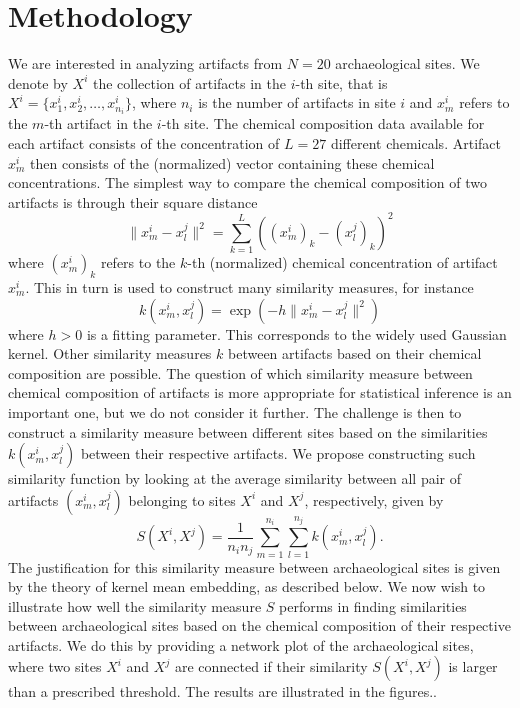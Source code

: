 \section{Methodology}
\label{sec:methodology}
We are interested in analyzing artifacts from $N=20$ archaeological sites. We denote by $X^i$ the collection of artifacts in the $i$-th site, that is $X^i=\{x^i_1,x^i_2,\dots,x^i_{n_i}\}$, where $n_i$ is the number of artifacts in site $i$ and $x^i_m$ refers to the $m$-th artifact in the $i$-th site.
The chemical composition data available for each artifact consists of the concentration of $L=27$ different chemicals. Artifact $x^i_m$ then consists of the (normalized) vector containing these chemical concentrations.
The simplest way to compare the chemical composition of two artifacts is through their square distance
$$ \| x^i_m - x^j_l \|^2 = \sum_{k=1}^L ( (x^i_m)_k - (x^j_l)_k )^2$$
where $(x^i_m)_k$ refers to the $k$-th (normalized) chemical concentration of artifact $x^i_m$.
This in turn is used to construct many similarity measures, for instance
$$ k(x^i_m,x^j_l) = \exp(-h\|x^i_m - x^j_l \|^2)$$
where $h>0$ is a fitting parameter. This corresponds to the widely used Gaussian kernel. Other similarity measures $k$ between artifacts based on their chemical composition are possible. The question of which similarity measure between chemical composition of artifacts is more appropriate for statistical inference is an important one, but we do not consider it further.
The challenge is then to construct a similarity measure between different sites based on the similarities ${k(x^i_m,x^j_l)}$ between their respective artifacts. We propose constructing such similarity function by looking at the average similarity between all pair of artifacts $(x^i_m,x^j_l)$ belonging to sites $X^i$ and $X^j$, respectively, given by
$$S(X^i,X^j) = \frac{1}{n_i n_j} \sum_{m=1}^{n_i} \sum_{l=1}^{n_j} k(x^i_m,x^j_l).$$
The justification for this similarity measure between archaeological sites is given by the theory of kernel mean embedding, as described below.
We now wish to illustrate how well the similarity measure $S$ performs in finding similarities between archaeological sites based on the chemical composition of their respective artifacts. We do this by providing a network plot of the archaeological sites, where two sites $X^i$ and $X^j$ are connected if their similarity $S(X^i,X^j)$ is larger than a prescribed threshold. The results are illustrated in the figures..
